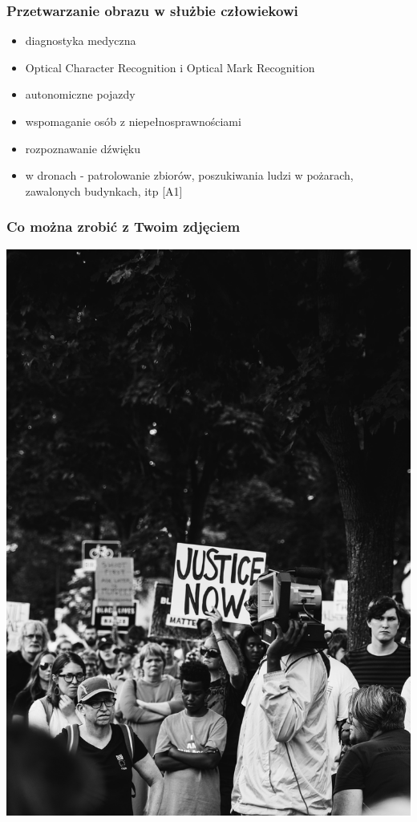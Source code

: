 \documentclass{beamer}
\begin{document}
            \begin{frame}
                \frametitle{Przetwarzanie obrazu w służbie człowiekowi}
                \begin{itemize}
                    \item diagnostyka medyczna
                    \item Optical Character Recognition i Optical Mark Recognition
                    \item autonomiczne pojazdy
                    \item wspomaganie osób z niepełnosprawnościami
                    \item rozpoznawanie dźwięku
                    \item w dronach - patrolowanie zbiorów, poszukiwania ludzi w pożarach, zawalonych budynkach, itp [A1]
                \end{itemize}
            \end{frame}

            \begin{frame}
                \begin{center}
                    \frametitle{Co można zrobić z Twoim zdjęciem}
                    \includegraphics[height=0.8\textheight]{pictures/protest.jpg}
                \end{center}
            \end{frame}
\end{document}
